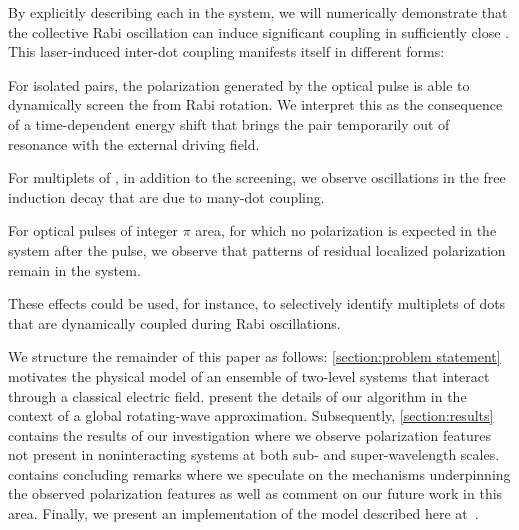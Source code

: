 By explicitly describing each \qd{} in the system, we will numerically demonstrate  that the collective Rabi oscillation can induce significant coupling in sufficiently close \qds{}.
This laser-induced inter-dot coupling manifests itself in different forms:
\begin{inparaenum}[(i)]
  \item For isolated \qd{} pairs, the polarization generated by the optical pulse is able to dynamically screen the \qds{} from Rabi rotation.
    We interpret this as the consequence of a time-dependent energy shift that brings the pair temporarily out of resonance with the external driving field.
  \item For multiplets of \qds{}, in addition to the screening, we observe oscillations in the free induction decay that are due to many-dot coupling.
  \item For optical pulses of integer $\pi$ area, for which no polarization is expected in the system after the pulse, we observe that patterns of residual localized polarization remain in the system.
\end{inparaenum}
These effects could be used, for instance, to selectively identify multiplets of dots that are dynamically coupled during Rabi oscillations.

We structure the remainder of this paper as follows: \cref{section:problem statement} motivates the physical model of an ensemble of two-level systems that interact through a 
classical electric field.
 present the details of our algorithm in the context of a global rotating-wave approximation.
Subsequently, \cref{section:results} contains the results of our investigation where we observe polarization features not present in noninteracting systems at both sub- and super-wavelength scales.
 contains concluding remarks where we speculate on the mechanisms underpinning the observed polarization features as well as comment on our future work in this area.
Finally, we present an implementation of the model described here at~\cite{githubpage}.
